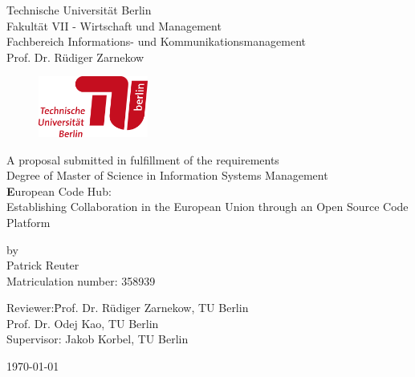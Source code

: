 \begin{titlepage}	
\noindent
\begin{minipage}{0.75\textwidth}
{\small
Technische Universit\"at Berlin\\
Fakult\"at VII - Wirtschaft und Management\\
Fachbereich Informations- und Kommunikationsmanagement\\
Prof. Dr. Rüdiger Zarnekow\\
}%
\end{minipage}%
\begin{minipage}{0.25\textwidth}%
\begin{figure}[H]%
{\raggedleft\includegraphics[height=2cm]{images/TU_Logo_lang_RGB_rot.png}}
\end{figure}%
\hfill
\end{minipage}%

\vspace{2cm}

\thispagestyle{empty}
\begin{center}

{\large
A proposal submitted in fulfillment of the requirements\\
Degree of Master of Science in Information Systems Management}\\
\vspace{1cm}
{\huge\textbf
European Code Hub:\\
Establishing Collaboration in the European Union through an Open Source Code Platform
}
\vspace{1.2cm}

{\large by\\
	 Patrick Reuter \\
	 Matriculation number: 358939\\[2cm]
}

\begin{minipage}{\linewidth} 
\begin{tabbing}
  		Reviewer:\quad \= Prof. Dr. Rüdiger Zarnekow, TU Berlin\\
                    \> Prof. Dr. Odej Kao, TU Berlin \\[0.3cm]
    	Supervisor:             \> Jakob Korbel, TU Berlin \\
    						         
\end{tabbing}
\end{minipage}

\vspace{1.5cm}
\today{} \\
\end{center}
\thispagestyle{empty}
\newpage
\setcounter{page}{1}
\end{titlepage}

\shipout\null
